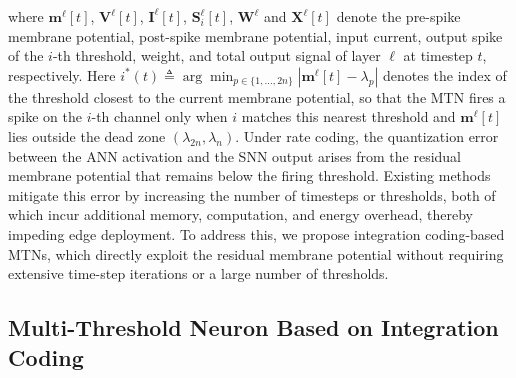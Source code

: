 where $\mathbf{m}^\ell[t]$, $\mathbf{V}^\ell[t]$, $\mathbf{I}^\ell[t]$, $\mathbf{S}_i^\ell[t]$, 
$\mathbf{W}^\ell$ and $\mathbf{X}^\ell[t]$ denote the pre-spike membrane potential, 
post-spike membrane potential, input current, output spike of the $i$-th 
threshold, weight, and total output signal of layer $\ell$ at timestep $t$, 
respectively. Here $i^*(t) \triangleq \arg\min_{p \in \{1,\ldots,2n\}} 
|\mathbf{m}^\ell[t] - \lambda_p|$ denotes the index of the threshold closest to the 
current membrane potential, so that the MTN fires a spike on the $i$-th 
channel only when $i$ matches this nearest threshold and $\mathbf{m}^\ell[t]$ lies 
outside the dead zone $(\lambda_{2n}, \lambda_n)$. Under rate coding, the 
quantization error between the ANN activation and the SNN output arises 
from the residual membrane potential that remains below the firing 
threshold. Existing methods mitigate this error by increasing the number 
of timesteps or thresholds, both of which incur additional memory, 
computation, and energy overhead, thereby impeding edge deployment. To 
address this, we propose integration coding-based MTNs, which directly 
exploit the residual membrane potential without requiring extensive 
time-step iterations or a large number of thresholds.

\subsection{Multi-Threshold Neuron Based on Integration Coding}

